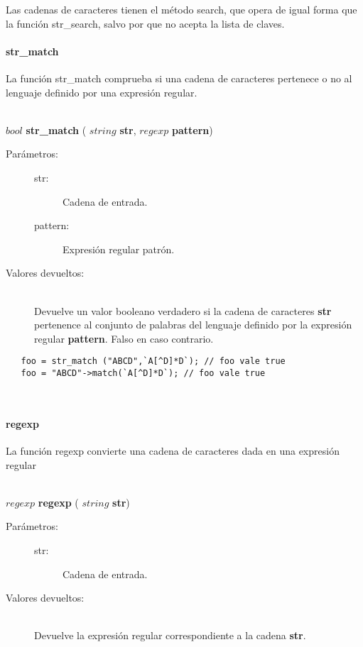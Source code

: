 Las cadenas de caracteres tienen el método search, que opera de igual forma que la
función str\_search, salvo por que no acepta la lista de claves.

\paragraph{str\_match}
La función str\_match comprueba si una cadena de caracteres pertenece o no al
lenguaje definido por una expresión regular.

\hfill \\ $bool$ \textbf{str\_match} ( $string$ \textbf{str}, $regexp$ \textbf{pattern})  
\begin{description}
\item [Parámetros:] \hfill 
   \begin{description}
   \item[str:] Cadena de entrada.
   \item[pattern:] Expresión regular patrón. 
   \end{description}
\item[Valores devueltos:] \hfill \\
   Devuelve un valor booleano verdadero si la cadena de caracteres \textbf{str} pertenence
   al conjunto de palabras del lenguaje definido por la expresión regular \textbf{pattern}. Falso
   en caso contrario.
\end{description}

\begin{lstlisting}   
   foo = str_match ("ABCD",`A[^D]*D`); // foo vale true
   foo = "ABCD"->match(`A[^D]*D`); // foo vale true
\end{lstlisting}
\hfill\\ 

\paragraph{regexp}
La función regexp convierte una cadena de caracteres dada en una expresión regular

\hfill \\ $regexp$ \textbf{regexp} ( $string$ \textbf{str})  
\begin{description}
\item [Parámetros:] \hfill 
   \begin{description}
   \item[str:] Cadena de entrada.
   \end{description}
\item[Valores devueltos:] \hfill \\
   Devuelve la expresión regular correspondiente a la cadena \textbf{str}.
\end{description}

